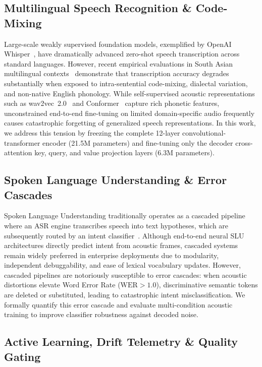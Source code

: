 \documentclass[sigconf,authordraft]{acmart}
\begin{document}
\subsection{Multilingual Speech Recognition & Code-Mixing}

Large-scale weakly supervised foundation models, exemplified by OpenAI Whisper~\cite{radford2023robust},
have dramatically advanced zero-shot speech transcription across standard languages. However, recent empirical
evaluations in South Asian multilingual contexts~\cite{diwan2021indicnlp} demonstrate that transcription accuracy
degrades substantially when exposed to intra-sentential code-mixing, dialectal variation, and non-native English
phonology. While self-supervised acoustic representations such as wav2vec~2.0~\cite{baevski2020wav2vec} and
Conformer~\cite{gulati2020conformer} capture rich phonetic features, unconstrained end-to-end fine-tuning on limited
domain-specific audio frequently causes catastrophic forgetting of generalized speech representations. In this
work, we address this tension by freezing the complete 12-layer convolutional-transformer encoder (21.5M parameters)
and fine-tuning only the decoder cross-attention key, query, and value projection layers (6.3M parameters).

\subsection{Spoken Language Understanding & Error Cascades}

Spoken Language Understanding traditionally operates as a cascaded pipeline where an ASR engine transcribes
speech into text hypotheses, which are subsequently routed by an intent classifier~\cite{lugosch2019speech,ghannay2021end}.
Although end-to-end neural SLU architectures directly predict intent from acoustic frames, cascaded systems
remain widely preferred in enterprise deployments due to modularity, independent debuggability, and ease of
lexical vocabulary updates. However, cascaded pipelines are notoriously susceptible to error cascades: when
acoustic distortions elevate Word Error Rate ($\text{WER} > 1.0$), discriminative semantic tokens are deleted
or substituted, leading to catastrophic intent misclassification. We formally quantify this error cascade
and evaluate multi-condition acoustic training to improve classifier robustness against decoded noise.

\subsection{Active Learning, Drift Telemetry & Quality Gating}
\end{document}
